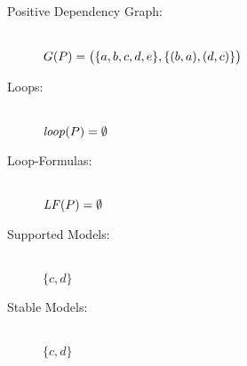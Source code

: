 \begin{Loesung}
\begin{UList}
\begin{description}
\item[Positive Dependency Graph:] ~\\
$G(P)=\big(\{a,b,c,d,e\},\{(b,a),(d,c)\}\big)$
%
\item[Loops:] ~\\
$\mathit{loop}(P)=\emptyset$
%
\item[Loop-Formulas:] ~\\
$\mathit{LF}(P)=\emptyset$
%
\item[Supported Models:] ~\\
$\{c,d\}$
%
\item[Stable Models:] ~\\
$\{c,d\}$
%
\end{description}
%
\item 
\begin{description}
%
%

\end{description}
\end{UList}
\end{Loesung}
